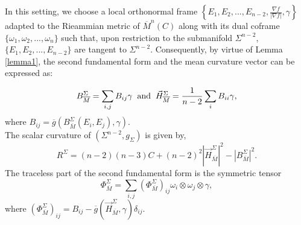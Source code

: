 \documentclass[11pt]{amsart}
\numberwithin{equation}{section}
\begin{document}
In this setting, we choose a local orthonormal frame $\left\{E_1, E_2, ..., E_{n-2}, \frac{\nabla f}{|\nabla f|}, \gamma\right\}$ adapted to the Rieammian metric of $\overline{M}^n(C)$ along with its dual coframe $\{ \omega_1, \omega_2,..., \omega_n\}$ such that, upon restriction to the submanifold $\Sigma^{n-2}$, $\{E_1, E_2, ..., E_{n-2}\}$ are tangent to $\Sigma^{n-2}$. Consequently, by virtue of Lemma \ref{lemma1}, the second fundamental form and the mean curvature vector %
can be expressed as:
    
\begin{equation}
    B^{\Sigma}_{\overline{M}}=\sum_{i, j} B_{ij} \gamma \hspace{2mm} \text{and} \hspace{2mm} \vec{H}^{\Sigma}_{\overline{M}}=\frac{1}{n-2}\sum_iB_{ii} \gamma, %
\end{equation}
 where $B_{ij}=\overline{g}\left(B^{\Sigma}_{\overline{M}}(E_i, E_j), \gamma\right)$.\\
The scalar curvature of $(\Sigma^{n-2}, g_{\Sigma})$ is given by,
\begin{equation}\label{FE4}
    R^{\Sigma}=(n-2)(n-3)C+(n-2)^2 \left|\vec{H}^{\Sigma}_{\overline{M}}\right|^2-\left|B^{\Sigma}_{\overline{M}}\right|^2.
\end{equation}
The traceless part of the second fundamental form is the symmetric tensor
\begin{equation}\label{FE27}
    \Phi^{\Sigma}_{\overline{M}}=\sum\limits_{i, j} \left(\Phi^{\Sigma}_{\overline{M}}\right)_{ij} \omega_i\otimes \omega_j\otimes \gamma, 
\end{equation}
where $\left(\Phi^{\Sigma}_{\overline{M}}\right)_{ij}=B_{ij}-\overline{g}\left(\vec{H}^{\Sigma}_{\overline{M}}, \gamma \right) \delta_{ij}$.
\end{document}
